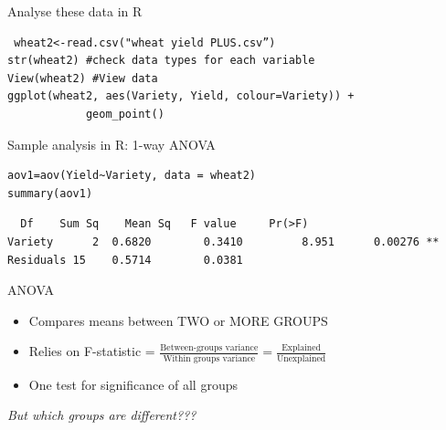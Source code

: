 \documentclass{beamer}
\makeatletter
\newenvironment{kframe}{%
 \def\at@end@of@kframe{}%
 \ifinner\ifhmode%
  \def\at@end@of@kframe{\end{minipage}}%
  \begin{minipage}{\columnwidth}%
 \fi\fi%
 \def\FrameCommand##1{\hskip\@totalleftmargin \hskip-\fboxsep
 \colorbox{shadecolor}{##1}\hskip-\fboxsep
     \hskip-\linewidth \hskip-\@totalleftmargin \hskip\columnwidth}%
 \MakeFramed {\advance\hsize-\width
   \@totalleftmargin\z@ \linewidth\hsize
   \@setminipage}}%
 {\par\unskip\endMakeFramed%
 \at@end@of@kframe}
\newenvironment{knitrout}{}{} %
\makeatother
\begin{document}
\begin{frame}[fragile]{Analyse these data in R}
 
 \begin{knitrout}
\color{fgcolor}\begin{kframe}
\footnotesize
\begin{verbatim}
 wheat2<-read.csv("wheat yield PLUS.csv”)
str(wheat2) #check data types for each variable
View(wheat2) #View data
ggplot(wheat2, aes(Variety, Yield, colour=Variety)) +
            geom_point()
\end{verbatim}
\end{kframe}
\end{knitrout}

\end{frame}

\begin{frame}[fragile]{Sample analysis in R: 1-way ANOVA}
 
  \begin{knitrout}
\color{fgcolor}\begin{kframe}
\footnotesize
\begin{verbatim}
aov1=aov(Yield~Variety, data = wheat2)
summary(aov1)
\end{verbatim}
\end{kframe}
\end{knitrout}
 
   \begin{knitrout}
\color{fgcolor}\begin{kframe}
\footnotesize
\begin{verbatim}
  Df 	Sum Sq    Mean Sq 	F value  	Pr(>F)   
Variety      2 	0.6820        0.3410         8.951 		0.00276 **
Residuals 15 	0.5714        0.0381   
\end{verbatim}
\end{kframe}
\end{knitrout}
 
 \begin{alertblock}{ANOVA}
 \begin{itemize}
  \item Compares means between TWO or MORE GROUPS
  \item Relies on F-statistic = $\frac{\text{Between-groups variance}}{\text{Within groups variance}} = \frac{\text{Explained}}{\text{Unexplained}}$ 
  \item One test for significance of all groups
 \end{itemize}
 \end{alertblock}
 
 \pause
 
 \emph{But which groups are different???}
\end{frame}
\end{document}
